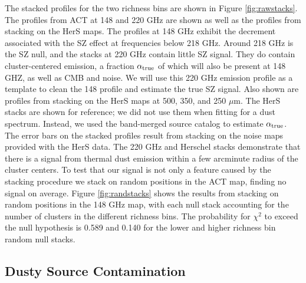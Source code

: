 \documentclass[a4paper,fleqn,usenatbib]{mnras}
\begin{document}
The stacked profiles for the two richness bins are shown in Figure \ref{fig:rawstacks}. The profiles from ACT at 148 and 220 GHz are shown as well as the profiles from stacking on the HerS maps. The profiles at 148 GHz exhibit the decrement associated with the SZ effect at frequencies below 218 GHz. Around 218 GHz is the SZ null, and the stacks at 220 GHz contain little SZ signal. They do contain cluster-centered emission, a fraction $\alpha_{\rm true}$ of which will also be present at 148 GHZ, as well as CMB and noise. We will use this 220 GHz emission profile as a template to clean the 148 profile and estimate the true SZ signal. Also shown are profiles from stacking on the HerS maps at 500, 350, and 250 $\mu$m. The HerS stacks are shown for reference; we did not use them when fitting for a dust spectrum. Instead, we used the band-merged source catalog \citep{2014ApJS..210...22V} to estimate $\alpha_{\rm true}$. The error bars on the stacked profiles result from stacking on the noise maps provided with the HerS data. The 220 GHz and Herschel stacks demonstrate that there is a signal from thermal dust emission within a few arcminute radius of the cluster centers.
To test that our signal is not only a feature caused by the stacking procedure we stack on random positions in the ACT map, finding no signal on average. Figure \ref{fig:randstacks} shows the results from stacking on random positions in the 148 GHz map, with each null stack accounting for the number of clusters in the different richness bins. The probability for $\chi^2$ to exceed the null hypothesis is 0.589 and 0.140 for the lower and higher richness bin random null stacks.


\subsection{Dusty Source Contamination}
\end{document}
